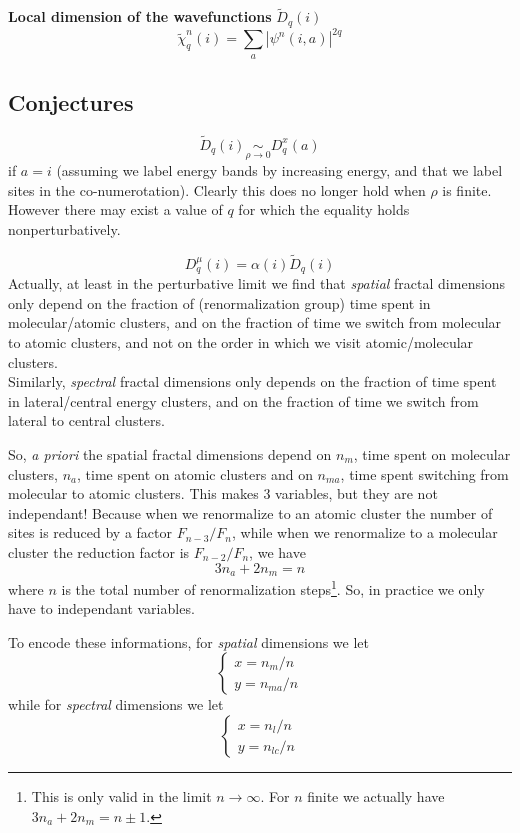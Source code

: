 \documentclass[11pt]{article}
\newcommand{\simlim}[2]{\ensuremath{ \underset{#1 \rightarrow #2}{\sim} }}
\begin{document}
\textbf{Local dimension of the wavefunctions} $\boxed{\tilde D_q(i)}$
\begin{equation}
	\tilde \chi^n_q(i) = \sum_a|\psi^n(i,a)|^{2q}
\end{equation}

\subsection{Conjectures}
\begin{equation}
	\tilde{D}_q(i)  \simlim{\rho}{0} D^x_q(a)
\end{equation}
if $a=i$ (assuming we label energy bands by increasing energy, and that we label sites in the co-numerotation).
Clearly this does no longer hold when $\rho$ is finite.
However there may exist a value of $q$ for which the equality holds nonperturbatively.

\begin{equation}
	D^\mu_q(i) = \alpha(i) \tilde{D}_q(i)
\end{equation}
Actually, at least in the perturbative limit we find that \emph{spatial} fractal dimensions only depend on the fraction of (renormalization group) time spent in molecular/atomic clusters, and on the fraction of time we switch from molecular to atomic clusters, and not on the order in which we visit atomic/molecular clusters. \\
Similarly, \emph{spectral} fractal dimensions only depends on the fraction of time spent in lateral/central energy clusters, and on the fraction of time we switch from lateral to central clusters.

So, \textit{a priori} the spatial fractal dimensions depend on $n_m$, time spent on molecular clusters, $n_a$, time spent on atomic clusters and on $n_{ma}$, time spent switching from molecular to atomic clusters. 
This makes 3 variables, but they are not independant! Because when we renormalize to an atomic cluster the number of sites is reduced by a factor $F_{n-3}/F_n$, while when we renormalize to a molecular cluster the reduction factor is $F_{n-2}/F_n$, we have
\begin{equation}
	3 n_a + 2 n_m = n
\end{equation}
where $n$ is the total number of renormalization steps\footnote{This is only valid in the limit $n \rightarrow \infty$. For $n$ finite we actually have $3 n_a + 2 n_m = n \pm 1$.}.
So, in practice we only have to independant variables.

To encode these informations, for \emph{spatial} dimensions we let
\begin{equation}
	  \begin{cases}
        x = n_m/n \\
        y = n_{ma}/n
      \end{cases}
\end{equation} 
while for \emph{spectral} dimensions we let
\begin{equation}
	  \begin{cases}
        x = n_l/n \\
        y = n_{lc}/n
      \end{cases}
\end{equation} 
\end{document}
